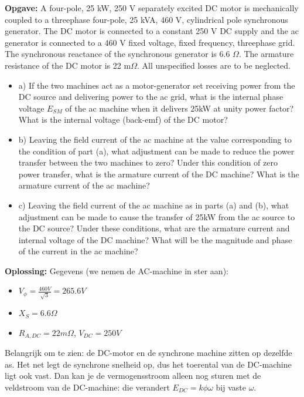 \begin{oefenblok}
\textbf{Opgave:}
\newline
A four-pole, 25 kW, 250 V separately excited DC motor is
mechanically coupled to a threephase four-pole, 25 kVA, 460 V,
cylindrical pole synchronous generator. The DC motor is connected
to a constant 250 V DC supply and the ac generator is connected to
a 460 V fixed voltage, fixed frequency, threephase grid. The
synchronous reactance of the synchronous generator is 6.6 $\Omega$. The
armature resistance of the DC motor is 22 m$\Omega$. All unspecified
losses are to be neglected.
\begin{itemize}
 \item a) If the two machines act as a motor-generator set receiving power from the
DC source and delivering power to the ac grid, what is the internal phase
voltage $E_{SM}$ of the ac machine when it delivers 25kW at unity power factor?
What is the internal voltage (back-emf) of the DC motor?
 \item b) Leaving the field current of the ac machine at the value corresponding to the
condition of part (a), what adjustment can be made to reduce the power
transfer between the two machines to zero? Under this condition of zero
power transfer, what is the armature current of the DC machine? What is
the armature current of the ac machine?
 \item c) Leaving the field current of the ac machine as in parts (a) and (b), what
adjustment can be made to cause the transfer of 25kW from the ac source
to the DC source? Under these conditions, what are the armature current
and internal voltage of the DC machine? What will be the magnitude and
phase of the current in the ac machine?
\end{itemize}
\textbf{Oplossing:}
\newline
Gegevens (we nemen de AC-machine in ster aan):
\begin{itemize}
    \item $V_\phi = \frac{460 V}{\sqrt{3}} = 265.6 V$
    \item $X_S = 6.6 \Omega$
    \item $R_{A,DC} = 22 m\Omega$, $V_{DC} = 250 V$
\end{itemize}
Belangrijk om te zien: de DC-motor en de synchrone machine zitten op dezelfde as.
Het net legt de synchrone snelheid op, dus het toerental van de DC-machine ligt ook vast.
Dan kan je de vermogensstroom alleen nog sturen met de veldstroom van de DC-machine:
die verandert $E_{DC} = k \phi \omega$ bij vaste $\omega$.

\end{oefenblok}
